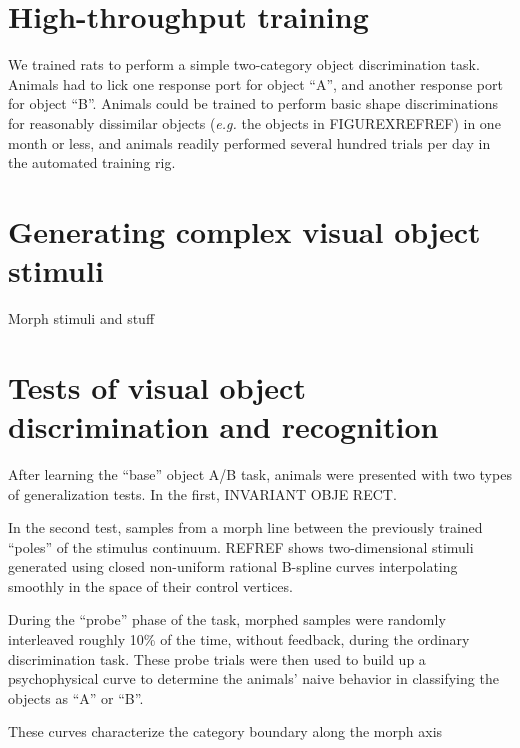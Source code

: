\section{High-throughput training}

We trained rats to perform a simple two-category object discrimination task. Animals had to lick one response port for object ``A'', and another response port for object ``B''.  Animals could be trained to perform basic shape discriminations for reasonably dissimilar objects (\textit{e.g.} the objects in FIGUREXREFREF) in one month or less, and animals readily performed several hundred trials per day in the automated training rig. 


\section{Generating complex visual object stimuli}
Morph stimuli and stuff


\section{Tests of visual object discrimination and recognition}

After learning the ``base'' object A/B task, animals were presented with two types of generalization tests. In the first, INVARIANT OBJE RECT.

In the second test, samples from a morph line between the previously trained ``poles'' of the stimulus continuum. REFREF shows two-dimensional stimuli generated using closed non-uniform rational B-spline curves interpolating smoothly in the space of their control vertices. 

During the ``probe'' phase of the task, morphed samples were randomly interleaved roughly 10\% of the time, without feedback, during the ordinary discrimination task. These probe trials were then used to build up a psychophysical curve to determine the animals' naive behavior in classifying the objects as ``A'' or ``B''. 

These curves characterize the category boundary along the morph axis 


